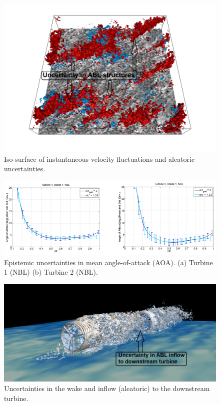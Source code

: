 \documentclass[]{aiaa-tc}%
\begin{document}
\begin{figure}
 \includegraphics[scale=0.25]{UQ1.png}
 \caption{Iso-surface of instantaneous velocity fluctuations and aleatoric uncertainties.}
 \label{f:UQ1}
\end{figure}

\begin{figure}
 \includegraphics[scale=0.25]{ALM_discrepancy.png}
 \caption{Epistemic uncertainties in mean angle-of-attack (AOA). (a) Turbine 1 (NBL)    (b) Turbine 2 (NBL).}
 \label{f:ALM_discrepancy}
\end{figure}

\begin{figure}
 \includegraphics[scale=0.25]{UQ3.png}
 \caption{Uncertainties in the wake and inflow (aleatoric) to the downstream turbine.}
 \label{f:UQ3}
\end{figure}
\end{document}
